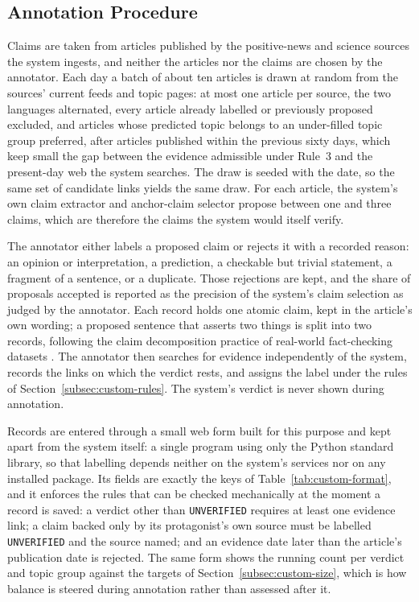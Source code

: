 \subsection{Annotation Procedure}
\label{subsec:custom-procedure}

Claims are taken from articles published by the positive-news and
science sources the system ingests, and neither the articles nor the
claims are chosen by the annotator. Each day a batch of about ten
articles is drawn at random from the sources' current feeds and topic
pages: at most one article per source, the two languages alternated,
every article already labelled or previously proposed excluded, and
articles whose predicted topic belongs to an under-filled topic group
preferred, after articles published within the previous sixty days,
which keep small the gap between the evidence admissible under
Rule~3 and the present-day web the system searches. The draw is seeded
with the date, so the same set of candidate links yields the same
draw.
For each article, the system's own claim extractor and anchor-claim
selector propose between one and three claims, which are therefore
the claims the system would itself verify.

The annotator either labels a proposed claim or rejects it with a
recorded reason: an opinion or interpretation, a prediction, a
checkable but trivial statement, a fragment of a sentence, or a
duplicate. Those rejections are kept, and the share of proposals
accepted is reported as the precision of the system's claim
selection as judged by the annotator. Each record holds one atomic
claim, kept in the article's own wording; a proposed sentence that
asserts two things is split into two records, following the claim
decomposition practice of real-world fact-checking datasets
\cite{guo2022survey}. The annotator then searches for evidence
independently of the system, records the links on which the verdict
rests, and assigns the label under the rules of
Section~\ref{subsec:custom-rules}. The system's verdict is never
shown during annotation.

Records are entered through a small web form built for this purpose
and kept apart from the system itself: a single program using only the
Python standard library, so that labelling depends neither on the
system's services nor on any installed package. Its fields are exactly
the keys of Table~\ref{tab:custom-format}, and it enforces the rules
that can be checked mechanically at the moment a record is saved:
a verdict other than \texttt{UNVERIFIED} requires at least one
evidence link; a claim backed only by its protagonist's own source
must be labelled \texttt{UNVERIFIED} and the source named; and an
evidence date later than the article's publication date is rejected.
The same form shows the running count per verdict and topic group
against the targets of Section~\ref{subsec:custom-size}, which is how
balance is steered during annotation rather than assessed after it.

